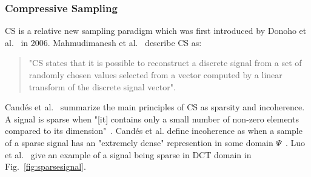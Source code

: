 

\subsubsection{Compressive Sampling}
\label{sec:Compressive Sampling}

\ac{CS} is a relative new sampling paradigm which was first
introduced by Donoho et al.~\cite{Donoho06compressedsensing} in 2006. 
Mahmudimanesh et al.~\cite{mahmudimanesh2010reordering} describe \ac{CS} as:

\begin{quotation}
    "\ac{CS} states that it is possible to reconstruct a discrete signal from a set of
    randomly chosen values selected from a vector computed by a linear transform
    of the discrete signal vector".
\end{quotation}

Candés et al.~\cite{candes2008introduction} summarize the main principles of
\ac{CS} as sparsity and incoherence. A signal is sparse when "[it] contains
only a small number of non-zero elements compared to its
dimension"~\cite{elzanati2015collaborative}. Candés et al. define incoherence
as when a sample of a sparse signal has an "extremely dense" represention in
some domain $ \Psi $~\cite{candes2008introduction}. Luo et
al.~\cite{luo2009compressive} give an example of a signal being sparse in
\ac{DCT} domain in Fig.~\ref{fig:sparsesignal}.

